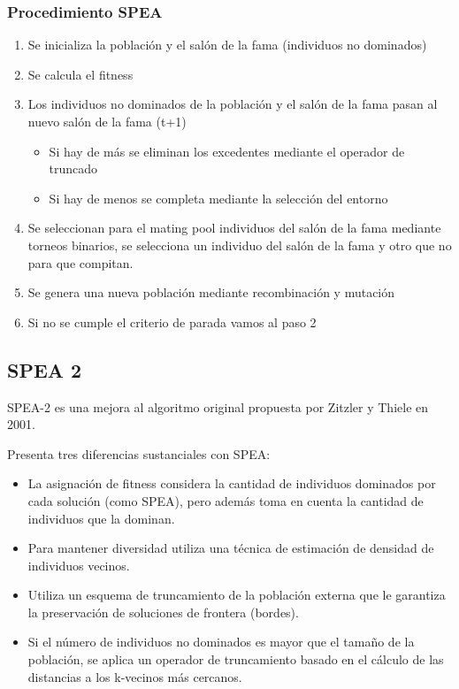 \documentclass[12pt, twoside, openright]{report} %
\begin{document}
\subsubsection{Procedimiento SPEA}
\begin{enumerate}
	\item Se inicializa la población y el salón de la fama (individuos no dominados)
	\item Se calcula el fitness
	\item Los individuos no dominados de la población y el salón de la fama pasan al nuevo salón de la fama (t+1)
	\begin{itemize}
		\item Si hay de más se eliminan los excedentes mediante el operador de truncado
		\item Si hay de menos se completa mediante la selección del entorno
	\end{itemize}
	\item Se seleccionan para el mating pool individuos del salón de la fama mediante torneos binarios, se selecciona un individuo del salón de la fama y otro que no para que compitan.
	\item Se genera una nueva población mediante recombinación y mutación
	\item Si no se cumple el criterio de parada vamos al paso 2
\end{enumerate}
\pagebreak
\subsection{SPEA 2}
SPEA-2 es una mejora al algoritmo original propuesta por Zitzler y Thiele en 2001.

Presenta tres diferencias sustanciales con SPEA:
\begin{itemize}
	\item La asignación de fitness considera la cantidad de individuos dominados por cada solución (como SPEA), pero además toma en cuenta la cantidad de individuos que la dominan.
	\item Para mantener diversidad utiliza una técnica de estimación de densidad de individuos vecinos.
	\item Utiliza un esquema de truncamiento de la población externa que le garantiza la preservación de soluciones de frontera (bordes).
	\item Si el número de individuos no dominados es mayor que el tamaño de la población, se aplica un operador de truncamiento basado en el cálculo de las distancias a los k-vecinos más cercanos.
\end{itemize}
\end{document}
